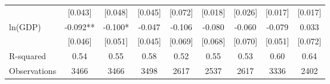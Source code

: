 \begin{table}[htbp]
{\begin{tabular}{l*{8}{c}}
                    &     [0.043]   &     [0.048]   &     [0.045]   &     [0.072]   &     [0.018]   &     [0.026]   &     [0.017]   &     [0.017]   \\
ln(GDP)             &      -0.092** &      -0.100*  &      -0.047   &      -0.106   &      -0.080   &      -0.060   &      -0.079   &       0.033   \\
                    &     [0.046]   &     [0.051]   &     [0.045]   &     [0.069]   &     [0.068]   &     [0.070]   &     [0.051]   &     [0.072]   \\
\midrule
R-squared           &        0.54   &        0.55   &        0.58   &        0.52   &        0.55   &        0.53   &        0.60   &        0.64   \\
Observations        &        3466   &        3466   &        3498   &        2617   &        2537   &        2617   &        3336   &        2402   \\
\bottomrule\end{tabular}}\end{table}
